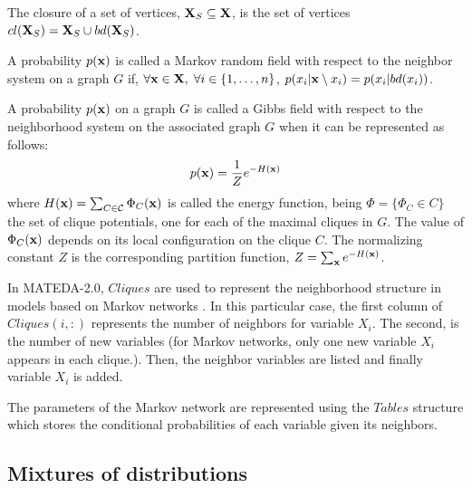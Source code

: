\documentclass[a4paper]{article}
\begin{document}
\begin{definition}
   The closure of a set of vertices, ${\bf{X}}_S \subseteq {\bf{X}}$, is the set of vertices
 $cl({\bf{X}}_S) = {\bf{X}}_S \cup bd({\bf{X}}_S)$.
\label{CLOSURE}
\end{definition}


\begin{definition}
 A probability $p({\bf{x}})$ is called a Markov random field with respect to the neighbor
system on  a graph $G$ if, $\forall   {\bf{x}} \in {\bf{X}}, \;
\forall i \in \{1, \ldots, n\}$,  $p(x_i|{\bf{x}} \setminus
x_i)=p(x_i|bd(x_i))$.
\end{definition}

\begin{definition}
A probability $p({\bf{x}})$ on a graph $G$ is called a Gibbs field
with respect to the neighborhood system on the associated graph $G$
when it can be represented as follows:
\begin{equation}
 p({\bf{x}}) = \frac{1}{Z} e^{-H({\bf{x}})}  \label{GIBBSAMP}
\end{equation}
 where  $H({\bf{x}}) = \sum_{C \in \mathcal{C}} \Phi_{C}({\bf{x}})$
 is called the energy function,  being $\Phi = \{\Phi_{C} \in C \}$  the set of clique potentials, one for each of the  maximal
cliques in $G$. The value of $\Phi_{C}({\bf{x}})$  depends on its
local configuration on the clique $C$. The normalizing constant $Z$
is the corresponding partition function,  $Z =\sum_{{\bf{x}}}
e^{-H({\bf{x}})}$.
\end{definition}

 In MATEDA-2.0, $Cliques$ are used to represent the neighborhood structure
in models based on Markov networks
\cite{Santana:2003c,Shakya_and_McCall:2007,Shakya_and_Santana:2008}.
In this particular case,   the first column of $Cliques(i,:)$
represents the number of neighbors for variable $X_i$.  The second,
is the number of new variables (for Markov networks, only one new
variable $X_i$ appears in each clique.).  Then, the neighbor variables are
listed and finally variable $X_i$ is added.

 The parameters of the Markov network are represented using the
 $Tables$ structure which stores the conditional probabilities of each variable given its
 neighbors.


\subsection{Mixtures of distributions}
\end{document}
